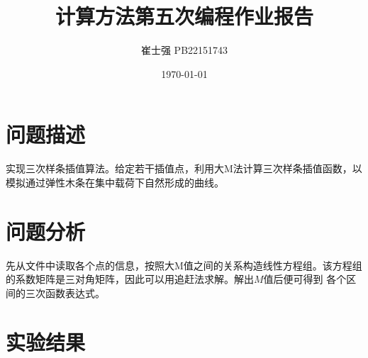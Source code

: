 \documentclass[UTF8]{ctexart}
\title{计算方法第五次编程作业报告}
\author{崔士强 PB22151743}
\date{\today}
\begin{document}
\maketitle

\section{问题描述}
实现三次样条插值算法。给定若干插值点，利用大M法计算三次样条插值函数，以模拟通过弹性木条在集中载荷下自然形成的曲线。

\section{问题分析}
先从文件中读取各个点的信息，按照大M值之间的关系构造线性方程组。该方程组的系数矩阵是三对角矩阵，因此可以用追赶法求解。解出$M$值后便可得到
各个区间的三次函数表达式。

\section{实验结果}
\end{document}
